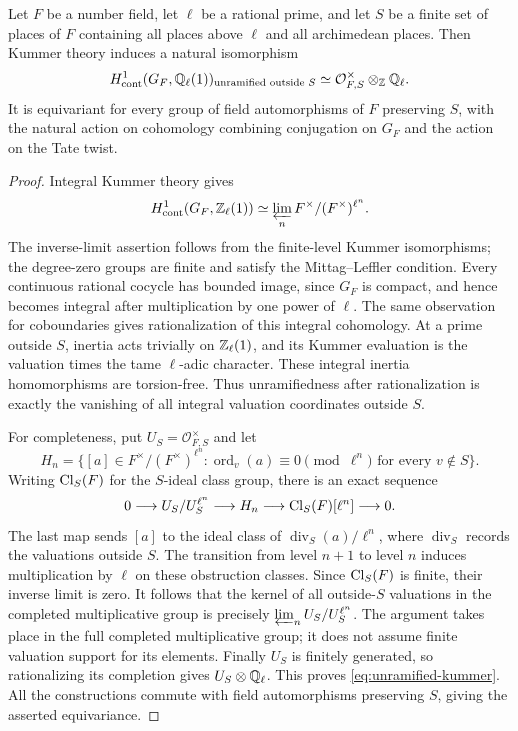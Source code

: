 \begin{lemma}\label{lem:kummer-unramified}
Let $F$ be a number field, let $\ell$ be a rational prime, and let $S$ be a finite set of places of $F$ containing all places above $\ell$ and all archimedean places. Then Kummer theory induces a natural isomorphism
\begin{equation}\label{eq:unramified-kummer}
 H^1_{\mathrm{cont}}(G_F,\mathbb Q_\ell(1))
 _{\text{unramified outside }S}
 \simeq \mathcal O_{F,S}^{\times}\otimes_{\mathbb Z}\mathbb Q_\ell.
\end{equation}
It is equivariant for every group of field automorphisms of $F$ preserving $S$, with the natural action on cohomology combining conjugation on $G_F$ and the action on the Tate twist.
\end{lemma}
\begin{proof}
Integral Kummer theory gives
\[
 H^1_{\mathrm{cont}}(G_F,\mathbb Z_\ell(1))
 \simeq\varprojlim_n F^\times/(F^\times)^{\ell^n}.
\]
The inverse-limit assertion follows from the finite-level Kummer isomorphisms; the degree-zero groups are finite and satisfy the Mittag--Leffler condition. Every continuous rational cocycle has bounded image, since $G_F$ is compact, and hence becomes integral after multiplication by one power of $\ell$. The same observation for coboundaries gives rationalization of this integral cohomology. At a prime outside $S$, inertia acts trivially on $\mathbb Z_\ell(1)$, and its Kummer evaluation is the valuation times the tame $\ell$-adic character. These integral inertia homomorphisms are torsion-free. Thus unramifiedness after rationalization is exactly the vanishing of all integral valuation coordinates outside $S$.

For completeness, put $U_S=\mathcal O_{F,S}^\times$ and let
\[
 H_n=\{[a]\in F^\times/(F^\times)^{\ell^n}:
       \operatorname{ord}_v(a)\equiv0\pmod{\ell^n}
       \text{ for every }v\notin S\}.
\]
Writing $\operatorname{Cl}_S(F)$ for the $S$-ideal class group, there is an exact sequence
\begin{equation}\label{eq:s-unit-completion}
 0\longrightarrow U_S/U_S^{\ell^n}
 \longrightarrow H_n
 \longrightarrow \operatorname{Cl}_S(F)[\ell^n]
 \longrightarrow0.
\end{equation}
The last map sends $[a]$ to the ideal class of
$\operatorname{div}_S(a)/\ell^n$, where $\operatorname{div}_S$ records the valuations outside $S$. The transition from level $n+1$ to level $n$ induces multiplication by $\ell$ on these obstruction classes. Since $\operatorname{Cl}_S(F)$ is finite, their inverse limit is zero. It follows that the kernel of all outside-$S$ valuations in the completed multiplicative group is precisely $\varprojlim_n U_S/U_S^{\ell^n}$. The argument takes place in the full completed multiplicative group; it does not assume finite valuation support for its elements. Finally $U_S$ is finitely generated, so rationalizing its completion gives $U_S\otimes\mathbb Q_\ell$. This proves \eqref{eq:unramified-kummer}. All the constructions commute with field automorphisms preserving $S$, giving the asserted equivariance.
\end{proof}

